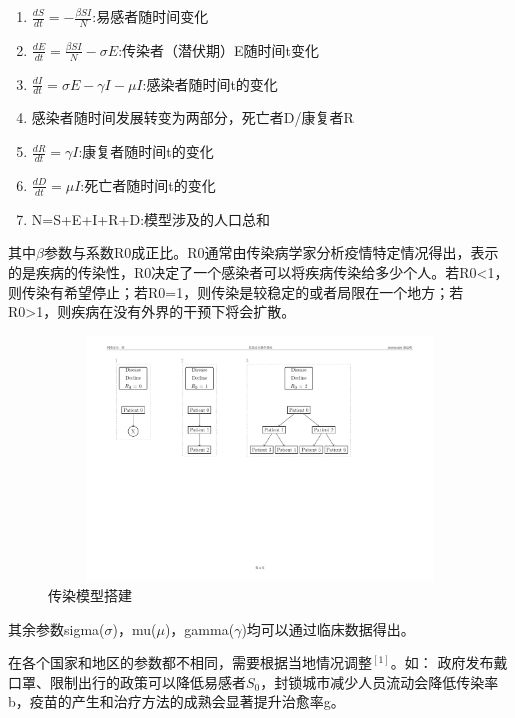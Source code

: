 \documentclass[withoutpreface,bwprint]{cumcmthesis} %
\begin{document}
\vspace*{0.2cm}
\begin{enumerate}
    \setlength{\itemsep}{2pt}
          \setlength{\parsep}{2pt}
          \setlength{\parskip}{2pt}
    \item $\frac{dS}{dt}= -\frac{\beta SI}{N}$:易感者随时间变化
    \item $\frac{dE}{dt}=\frac{\beta SI}{N}-\sigma E$:传染者（潜伏期）E随时间t变化
    \item $\frac{dI}{dt}=\sigma E-\gamma I- \mu I$:感染者随时间t的变化
    \item 感染者随时间发展转变为两部分，死亡者D/康复者R
    \item $\frac{dR}{dt}=\gamma I$:康复者随时间t的变化
    \item $\frac{dD}{dt}=\mu I$:死亡者随时间t的变化
    \item N=S+E+I+R+D:模型涉及的人口总和
\end{enumerate}

其中$\beta$参数与系数R0成正比。R0通常由传染病学家分析疫情特定情况得出，表示的是疾病的传染性，R0决定了一个感染者可以将疾病传染给多少个人。若R0<1，则传染有希望停止；若R0=1，则传染是较稳定的或者局限在一个地方；若R0>1，则疾病在没有外界的干预下将会扩散。

\begin{figure}[!htp]
    \centerline{\includegraphics[width=14.25cm,height=6.5cm]{figures/modlingfig_2.pdf}}
    \caption{传染模型搭建}
\end{figure}

\vspace{-0.3cm}
其余参数sigma($\sigma$)，mu($\mu$)，gamma($\gamma$)均可以通过临床数据得出。

在各个国家和地区的参数都不相同，需要根据当地情况调整$^{[1]}$。如：
政府发布戴口罩、限制出行的政策可以降低易感者$S_0$，封锁城市减少人员流动会降低传染率b，疫苗的产生和治疗方法的成熟会显著提升治愈率g。
\end{document}
